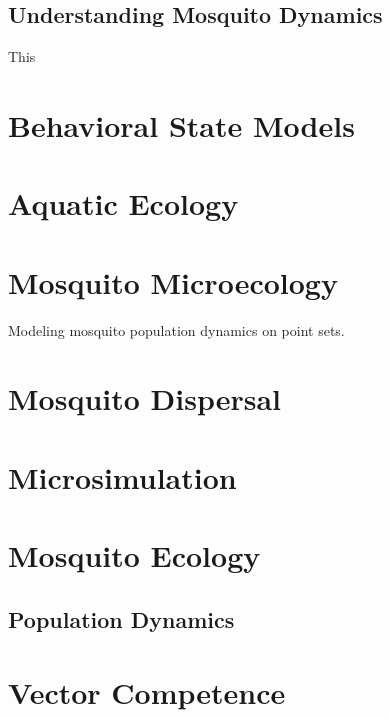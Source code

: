 \documentclass[
]{book}
\begin{document}
\hypertarget{understanding-mosquito-dynamics}{%
\section{Understanding Mosquito Dynamics}\label{understanding-mosquito-dynamics}}

This

\hypertarget{behavioral-state-models}{%
\chapter{Behavioral State Models}\label{behavioral-state-models}}

\hypertarget{aquatic-ecology}{%
\chapter{Aquatic Ecology}\label{aquatic-ecology}}

\hypertarget{mosquito-microecology}{%
\chapter{Mosquito Microecology}\label{mosquito-microecology}}

Modeling mosquito population dynamics on point sets.

\hypertarget{mosquito-dispersal}{%
\chapter{Mosquito Dispersal}\label{mosquito-dispersal}}

\hypertarget{microsimulation}{%
\chapter{Microsimulation}\label{microsimulation}}

\hypertarget{mosquito-ecology-1}{%
\chapter{Mosquito Ecology}\label{mosquito-ecology-1}}

\hypertarget{population-dynamics}{%
\section{Population Dynamics}\label{population-dynamics}}

\hypertarget{vector-competence}{%
\chapter{Vector Competence}\label{vector-competence}}
\end{document}
